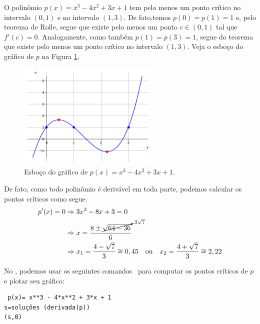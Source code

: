 \cleardoublepage\documentclass[../main.tex]{subfiles}
\begin{document}
\begin{ex}
  O polinômio $p(x) = x^3 - 4x^2 + 3x + 1$ tem pelo menos um ponto crítico no intervalo $(0,1)$ e no intervalo $(1,3)$. De fato,temos $p(0)=p(1)=1$ e, pelo teorema de Rolle, segue que existe pelo menos um ponto $c\in (0, 1)$ tal que $f'(c)=0$. Analogamente, como também $p(1)=p(3)=1$, segue do teorema que existe pelo menos um ponto crítico no intervalo $(1,3)$. Veja o esboço do gráfico de $p$ na Figura \ref{fig:ex_teo_Rolle}.
  \begin{figure}[!htb]
    \centering
    \includegraphics[width=0.6\textwidth]{./fig_apl_deriv/fig_ex_teo_Rolle}
    \caption{Esboço do gráfico de $p(x) = x^3 - 4x^2 + 3x + 1$.}
    \label{fig:ex_teo_Rolle}
  \end{figure}
  
  De fato, como todo polinômio é derivável em toda parte, podemos calcular os pontos críticos como segue.
  \begin{align*}
    p'(x) = 0 &\Rightarrow 3x^2 - 8x + 3 = 0 \\
              &\Rightarrow x = \frac{8 \pm \cancelto{2\sqrt{7}}{\sqrt{64 - 36}}}{6} \\
              &\Rightarrow x_1 = \frac{4 - \sqrt{7}}{3} \cong 0,45 \quad\text{ou}\quad x_2 = \frac{4 + \sqrt{7}}{3} \cong 2,22
  \end{align*}

  
  No \geogebra, podemos usar os seguintes comandos~ para computar os pontos críticos de $p$ e plotar seu gráfico:
\begin{verbatim}
 p(x)= x**3 - 4*x**2 + 3*x + 1
s=soluções (derivada(p))
(s,0)
\end{verbatim}

\end{ex}
\end{document}
